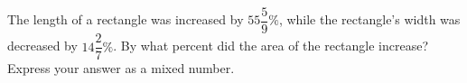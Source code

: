 The length of a rectangle was increased by $55\dfrac{5}{9}\%$, while the rectangle's width was decreased by $14\dfrac{2}{7}\%$. By what percent did the area of the rectangle increase? Express your answer as a mixed number.
